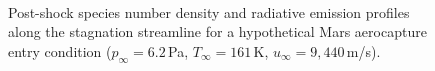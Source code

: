 { \begin{figure}[p]
 \centering
  \\
 \caption{Post-shock species number density and radiative emission profiles along the stagnation streamline for a hypothetical Mars aerocapture entry condition ($p_\infty = 6.2$\,Pa, $T_\infty = 161$\,K, $u_\infty = 9,440$\,m/s).}
\end{figure}

}
